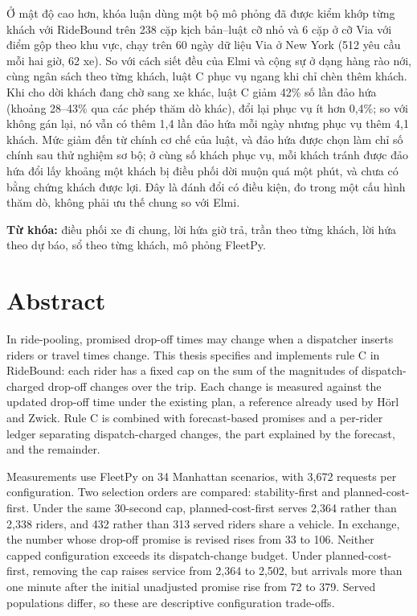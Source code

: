 Ở mật độ cao hơn, khóa luận dùng một bộ mô phỏng đã được kiểm khớp từng khách với RideBound trên 238 cặp kịch bản--luật
cỡ nhỏ và 6 cặp ở cỡ Via với điểm gộp theo khu vực, chạy trên 60 ngày dữ liệu Via ở New York (512 yêu cầu mỗi hai giờ,
62 xe). So với cách siết đều của Elmi và cộng sự ở dạng hàng rào nới, cùng ngân sách theo từng khách, luật C phục vụ ngang
khi chỉ chèn thêm khách. Khi cho dời khách đang chờ sang xe khác, luật C giảm 42\% số lần đảo hứa (khoảng 28--43\% qua các
phép thăm dò khác), đổi lại phục vụ ít hơn 0,4\%; so với không gán lại, nó vẫn có thêm 1,4 lần đảo hứa mỗi ngày nhưng phục
vụ thêm 4,1 khách. Mức giảm đến từ chính cơ chế của luật, và đảo hứa được chọn làm chỉ số chính sau thử nghiệm sơ bộ; ở cùng
số khách phục vụ, mỗi khách tránh được đảo hứa đổi lấy khoảng một khách bị điều phối dời muộn quá một phút, và chưa có bằng
chứng khách được lợi. Đây là đánh đổi có điều kiện, đo trong một cấu hình thăm dò, không phải ưu thế chung so với Elmi.

\vspace{6pt}
\noindent\textbf{Từ khóa:} điều phối xe đi chung, lời hứa giờ trả, trần theo từng khách, lời hứa theo dự báo,
sổ theo từng khách, mô phỏng FleetPy.
\clearpage

\chapter*{Abstract}

In ride-pooling, promised drop-off times may change when a dispatcher inserts riders or travel times change.
This thesis specifies and implements rule C in RideBound: each rider has a fixed cap on the sum of the magnitudes
of dispatch-charged drop-off changes over the trip. Each change is measured against the updated drop-off time
under the existing plan, a reference already used by Hörl and Zwick. Rule C is combined with forecast-based
promises and a per-rider ledger separating dispatch-charged changes, the part explained by the forecast, and the
remainder.

Measurements use FleetPy on 34 Manhattan scenarios, with 3,672 requests per configuration. Two selection orders
are compared: stability-first and planned-cost-first. Under the same 30-second cap, planned-cost-first serves
2,364 rather than 2,338 riders, and 432 rather than 313 served riders share a vehicle. In exchange, the number
whose drop-off promise is revised rises from 33 to 106. Neither capped configuration exceeds its dispatch-change
budget. Under planned-cost-first, removing the cap raises service from 2,364 to 2,502, but arrivals more than one
minute after the initial unadjusted promise rise from 72 to 379. Served populations differ, so these are
descriptive configuration trade-offs.

